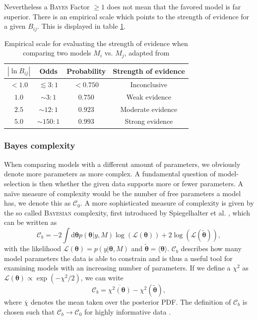 \documentclass[%
 reprint,
 amsmath,amssymb,
 aps,
]{revtex4-1}
\begin{document}
Nevertheless a \textsc{Bayes} Factor $\geq1$ does not mean that the favored model is far superior. There is an empirical scale which points to the strength of evidence for a given $B_{ij}$. This is displayed in table \ref{tab:bf}.


\begin{table}[htbp]

	\centering
	{\renewcommand{\arraystretch}{1.3}
	\begin{tabular}{|c|c|c|c|}
		\hline
		$|\ln B_{ij}|$& Odds & Probability & Strength of evidence \\
		\hline
		$< 1.0$& $ \lesssim 3:1$ & $< 0.750$  & Inconclusive  \\
		$1.0$ & $\sim 3:1$ & $0.750$ & Weak evidence  \\
		$2.5$& $\sim 12:1$ & $0.923$ & Moderate evidence \\
		$5.0$& $\sim 150:1$ & $0.993$ & Strong evidence \\
		\hline
	\end{tabular}}
\caption{Empirical scale for evaluating the strength of evidence when comparing two models $M_i$ vs. $M_j$, adapted from \cite{Trotta_2008}}
\label{tab:bf}
\end{table}


\subsubsection{\textbf{Bayes complexity}}
When comparing models with a different amount of parameters, we obviously denote more parameters as more complex. A fundamental question of model-selection is then whether the given data supports more or fewer parameters. A na\"ive measure of complexity would be the number of free parameters a model has, we denote this as $\mathcal{C}_0$. A more sophisticated measure of complexity is given by the so called \textsc{Bayesian} complexity, first introduced by Spiegelhalter et al. \cite{Spiegelhalter}, which can be written as \cite{kunz} 
\begin{equation}\label{eq:Bayes_Complexity}
	\mathcal{C}_b=-2\int \text{d}\boldsymbol{\theta} p(\boldsymbol{\theta}|y,M)\log(\mathcal{L}(\boldsymbol{\theta}))+2\log(\mathcal{L}(\boldsymbol{\tilde{\theta}})),
\end{equation}
with  the likelihood $\mathcal{L}(\boldsymbol{\theta})=p(y|\boldsymbol{\theta},M)$ and $\boldsymbol{\tilde{\theta}}=\langle\boldsymbol{\theta}\rangle$. $\mathcal{C}_b$ describes how many model parameters the data is able to constrain \cite{kunz} and is thus a useful tool for examining models with an increasing number of parameters. If we define a $\chi^2$ as $\mathcal{L}(\boldsymbol{\theta})\propto \exp(-\chi^2/2)$, we can write 
\begin{equation}\label{eq:Bayes_Complexity_alt}
	\mathcal{C}_b=\overline{\chi^2(\boldsymbol{\theta})}-\chi^2(\boldsymbol{\tilde{\theta}}),
\end{equation}
where $\overline{\chi}$ denotes the mean taken over the posterior PDF. 
The definition of $\mathcal{C}_b$ is chosen such that $\mathcal{C}_b\to\mathcal{C}_0$ for highly informative data \cite{kunz}.
\end{document}

